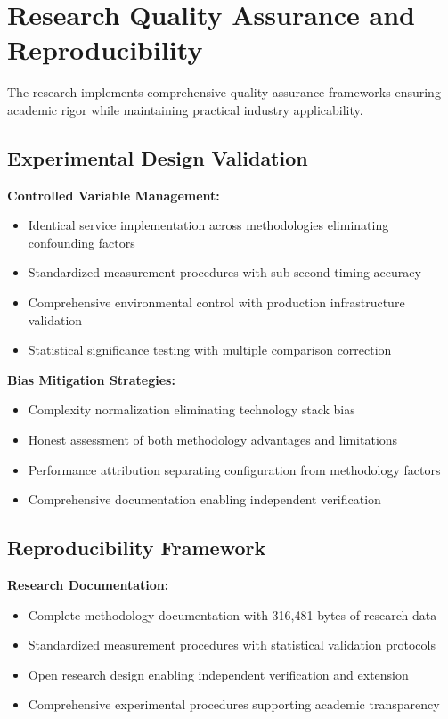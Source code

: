 \section{Research Quality Assurance and Reproducibility}

The research implements comprehensive quality assurance frameworks ensuring academic rigor while maintaining practical industry applicability.

\subsection{Experimental Design Validation}

\textbf{Controlled Variable Management:}
\begin{itemize}
\item Identical service implementation across methodologies eliminating confounding factors
\item Standardized measurement procedures with sub-second timing accuracy
\item Comprehensive environmental control with production infrastructure validation
\item Statistical significance testing with multiple comparison correction
\end{itemize}

\textbf{Bias Mitigation Strategies:}
\begin{itemize}
\item Complexity normalization eliminating technology stack bias
\item Honest assessment of both methodology advantages and limitations
\item Performance attribution separating configuration from methodology factors
\item Comprehensive documentation enabling independent verification
\end{itemize}

\subsection{Reproducibility Framework}

\textbf{Research Documentation:}
\begin{itemize}
\item Complete methodology documentation with 316,481 bytes of research data
\item Standardized measurement procedures with statistical validation protocols
\item Open research design enabling independent verification and extension
\item Comprehensive experimental procedures supporting academic transparency
\end{itemize}

